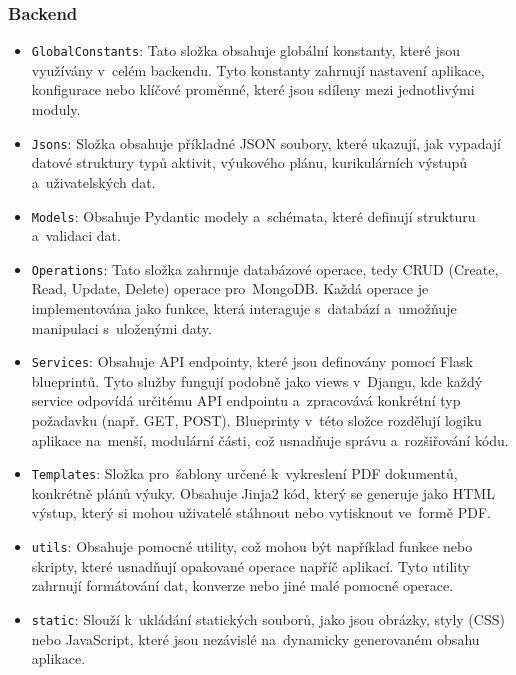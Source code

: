 \documentclass[male,czech,api_bc]{kitheses}
\begin{document}
\subsubsection{Backend}
\begin{itemize}
	\item \texttt{GlobalConstants}: Tato složka obsahuje globální konstanty, které jsou využívány v~celém backendu. Tyto konstanty zahrnují nastavení aplikace, konfigurace nebo klíčové proměnné, které jsou sdíleny mezi jednotlivými moduly.
	\item \texttt{Jsons}: Složka obsahuje příkladné JSON soubory, které ukazují, jak vypadají datové struktury typů aktivit, výukového plánu, kurikulárních výstupů a~uživatelských dat.
	\item \texttt{Models}: Obsahuje Pydantic modely a~schémata, které definují strukturu a~validaci dat.
	\item \texttt{Operations}: Tato složka zahrnuje databázové operace, tedy CRUD (Create, Read, Update, Delete) operace pro~MongoDB. Každá operace je implementována jako funkce, která interaguje s~databází a~umožňuje manipulaci s~uloženými daty.
	\item \texttt{Services}: Obsahuje API endpointy, které jsou definovány pomocí Flask blueprintů. Tyto služby fungují podobně jako views v~Djangu, kde každý service odpovídá určitému API endpointu a~zpracovává konkrétní typ požadavku (např. GET, POST). Blueprinty v~této složce rozdělují logiku aplikace na~menší, modulární části, což usnadňuje správu a~rozšiřování kódu.
	\item \texttt{Templates}: Složka pro~šablony určené k~vykreslení PDF dokumentů, konkrétně plánů výuky. Obsahuje Jinja2 kód, který se generuje jako HTML výstup, který si mohou uživatelé stáhnout nebo vytisknout ve~formě PDF.
	\item \texttt{utils}: Obsahuje pomocné utility, což mohou být například funkce nebo skripty, které usnadňují opakované operace napříč aplikací. Tyto utility zahrnují formátování dat, konverze nebo jiné malé pomocné operace.
	\item \texttt{static}: Slouží k~ukládání statických souborů, jako jsou obrázky, styly (CSS) nebo JavaScript, které jsou nezávislé na~dynamicky generovaném obsahu aplikace.
\end{itemize}
\end{document}
